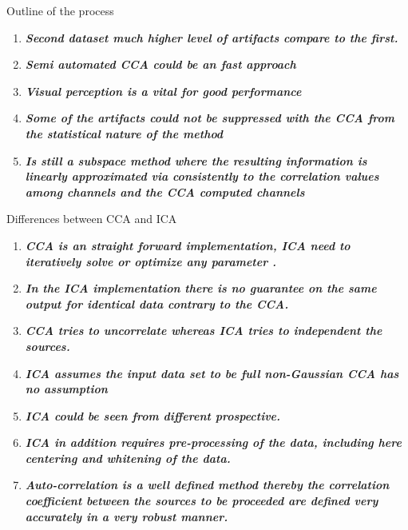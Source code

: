 \documentclass[t,12pt,english
\ifx\beamermode\undefined\else,\beamermode\fi
]{beamer}
\begin{document}
    
\begin{frame}{Outline of the process}

\begin{block}{\footnotesize{}}\tiny{}
\begin{enumerate} 
\vspace{0.05cm}
     \item \tiny{\textbf{\textit{Second dataset much higher level of artifacts compare to the first.}}}
     \item \tiny{\textbf{\textit{Semi automated CCA could be an fast approach}}}
     \item \tiny{\textbf{\textit{Visual perception is a vital for good performance}}}
     \item \tiny{\textbf{\textit{Some of the artifacts could not be suppressed with the CCA from the statistical nature of the method}}}
     \item \tiny{\textbf{\textit{Is still a subspace method where the resulting information is linearly approximated via consistently to the correlation values among channels and the CCA computed channels}}} 

     
\end{enumerate}
\end{block}

     
   
\end{frame} 
    
\begin{frame}{Differences between CCA and ICA}


\begin{block}{\footnotesize{}}\tiny{}
\begin{enumerate} 
\vspace{0.05cm}
     \item \tiny{\textbf{\textit{CCA is an straight forward implementation, ICA need to iteratively solve or optimize any parameter \cite{17}.}}} 
     \item \tiny{\textbf{\textit{In the ICA implementation there is no guarantee on the same output for identical data contrary to the CCA\cite{15}.}}} 
     \item \tiny{\textbf{\textit{CCA tries to uncorrelate  whereas ICA tries to independent the sources.}}} 
     \item \tiny{\textbf{\textit{ICA assumes the input data set to be full non-Gaussian CCA has no assumption}}} 
     \item \tiny{\textbf{\textit{ICA could be seen from different prospective.}}} 
     \item \tiny{\textbf{\textit{ICA in addition requires pre-processing  of the data, including here centering and whitening of the data.}}} 
     \item \tiny{\textbf{\textit{Auto-correlation is a well defined method thereby the correlation coefficient between the sources to be proceeded are defined very accurately in a very robust manner.}}} 

     
\end{enumerate}
\end{block}
     
   
\end{frame} 
    
\end{document}
